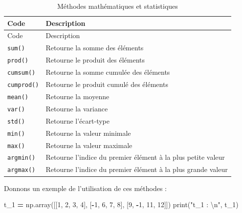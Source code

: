 \documentclass[
  12pt,
]{book}
\newenvironment{Shaded}{\begin{snugshade}}{\end{snugshade}}
\newcommand{\BuiltInTok}[1]{#1}
\newcommand{\CharTok}[1]{\textcolor[rgb]{0.31,0.60,0.02}{#1}}
\newcommand{\DecValTok}[1]{\textcolor[rgb]{0.00,0.00,0.81}{#1}}
\newcommand{\NormalTok}[1]{#1}
\newcommand{\OperatorTok}[1]{\textcolor[rgb]{0.81,0.36,0.00}{\textbf{#1}}}
\newcommand{\StringTok}[1]{\textcolor[rgb]{0.31,0.60,0.02}{#1}}
\numberwithin{equation}{section}
\numberwithin{countremarque}{section}
\begin{document}
\begin{longtable}[]{@{}
  >{\raggedleft\arraybackslash}p{}
  >{\raggedleft\arraybackslash}p{}@{}}
\caption{\label{tab:numpy-maths-methodes} Méthodes mathématiques et statistiques}\tabularnewline
\toprule\noalign{}
\begin{minipage}[b]{\linewidth}\raggedleft
Code
\end{minipage} & \begin{minipage}[b]{\linewidth}\raggedleft
Description
\end{minipage} \\
\midrule\noalign{}
\endfirsthead
\toprule\noalign{}
\begin{minipage}[b]{\linewidth}\raggedleft
Code
\end{minipage} & \begin{minipage}[b]{\linewidth}\raggedleft
Description
\end{minipage} \\
\midrule\noalign{}
\endhead
\bottomrule\noalign{}
\endlastfoot
\texttt{sum()} & Retourne la somme des éléments \\
\texttt{prod()} & Retourne le produit des éléments \\
\texttt{cumsum()} & Retourne la somme cumulée des éléments \\
\texttt{cumprod()} & Retourne le produit cumulé des éléments \\
\texttt{mean()} & Retourne la moyenne \\
\texttt{var()} & Retourne la variance \\
\texttt{std()} & Retourne l'écart-type \\
\texttt{min()} & Retourne la valeur minimale \\
\texttt{max()} & Retourne la valeur maximale \\
\texttt{argmin()} & Retourne l'indice du premier élément à la plus petite valeur \\
\texttt{argmax()} & Retourne l'indice du premier élément à la plus grande valeur \\
\end{longtable}

Donnons un exemple de l'utilisation de ces méthodes :

\begin{Shaded}
\begin{Highlighting}[]
\NormalTok{t\_1 }\OperatorTok{=}\NormalTok{ np.array([[}\DecValTok{1}\NormalTok{, }\DecValTok{2}\NormalTok{, }\DecValTok{3}\NormalTok{, }\DecValTok{4}\NormalTok{], [}\OperatorTok{{-}}\DecValTok{1}\NormalTok{, }\DecValTok{6}\NormalTok{, }\DecValTok{7}\NormalTok{, }\DecValTok{8}\NormalTok{], [}\DecValTok{9}\NormalTok{, }\OperatorTok{{-}}\DecValTok{1}\NormalTok{, }\DecValTok{11}\NormalTok{, }\DecValTok{12}\NormalTok{]])}
\BuiltInTok{print}\NormalTok{(}\StringTok{"t\_1 : }\CharTok{\textbackslash{}n}\StringTok{"}\NormalTok{, t\_1)}
\end{Highlighting}
\end{Shaded}
\end{document}
